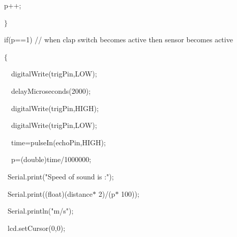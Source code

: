 \documentclass[12pt]{article}
\begin{document}
{\fontsize{14pt}{16.8pt}\selectfont \  p++;\par}\par

{\fontsize{14pt}{16.8pt}\selectfont \  $ \} $ \par}\par

{\fontsize{14pt}{16.8pt}\selectfont \  if(p==1) // when clap switch becomes active then sensor becomes active \par}\par

{\fontsize{14pt}{16.8pt}\selectfont \  $ \{ $ \par}\par

{\fontsize{14pt}{16.8pt}\selectfont \ \ \  digitalWrite(trigPin,LOW);\par}\par

{\fontsize{14pt}{16.8pt}\selectfont \ \ \  delayMicroseconds(2000);\par}\par

{\fontsize{14pt}{16.8pt}\selectfont \ \ \  digitalWrite(trigPin,HIGH);\par}\par

{\fontsize{14pt}{16.8pt}\selectfont \ \ \  digitalWrite(trigPin,LOW);\par}\par

{\fontsize{14pt}{16.8pt}\selectfont \ \ \  time=pulseIn(echoPin,HIGH);\par}\par

{\fontsize{14pt}{16.8pt}\selectfont \ \ \  p=(double)time/1000000;\par}\par

{\fontsize{14pt}{16.8pt}\selectfont \ \  Serial.print("Speed of sound is :");\par}\par

{\fontsize{14pt}{16.8pt}\selectfont \ \  Serial.print((float)(distance$\ast$ 2)/(p$\ast$ 100));\par}\par

{\fontsize{14pt}{16.8pt}\selectfont \ \  Serial.println("m/s");\par}\par

{\fontsize{14pt}{16.8pt}\selectfont \ \  lcd.setCursor(0,0);\par}\par
\end{document}
